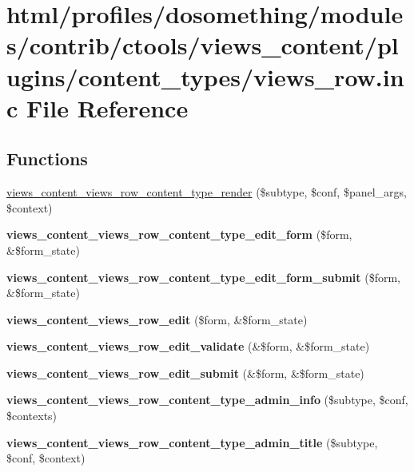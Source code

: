 \hypertarget{views__row_8inc}{
\section{html/profiles/dosomething/modules/contrib/ctools/views\_\-content/plugins/content\_\-types/views\_\-row.inc File Reference}
\label{views__row_8inc}
}
\subsection*{Functions}
\begin{DoxyCompactItemize}
\item 
\hyperlink{views__row_8inc_addde1c53bf68173bf2250309e339bf5b}{views\_\-content\_\-views\_\-row\_\-content\_\-type\_\-render} (\$subtype, \$conf, \$panel\_\-args, \$context)
\item 
\hypertarget{views__row_8inc_a03458e71f06b6793c866c384c4149c34}{
{\bfseries views\_\-content\_\-views\_\-row\_\-content\_\-type\_\-edit\_\-form} (\$form, \&\$form\_\-state)}
\label{views__row_8inc_a03458e71f06b6793c866c384c4149c34}

\item 
\hypertarget{views__row_8inc_a7c4f657c3f1f96528c1b8ce633894510}{
{\bfseries views\_\-content\_\-views\_\-row\_\-content\_\-type\_\-edit\_\-form\_\-submit} (\$form, \&\$form\_\-state)}
\label{views__row_8inc_a7c4f657c3f1f96528c1b8ce633894510}

\item 
\hypertarget{views__row_8inc_adf468e0c6a577476f3beafe89552516d}{
{\bfseries views\_\-content\_\-views\_\-row\_\-edit} (\$form, \&\$form\_\-state)}
\label{views__row_8inc_adf468e0c6a577476f3beafe89552516d}

\item 
\hypertarget{views__row_8inc_aea14ac09fb3b959871d43cfaca43ed7f}{
{\bfseries views\_\-content\_\-views\_\-row\_\-edit\_\-validate} (\&\$form, \&\$form\_\-state)}
\label{views__row_8inc_aea14ac09fb3b959871d43cfaca43ed7f}

\item 
\hypertarget{views__row_8inc_ae0ba9c5f277c64fdada8aa2403f90aed}{
{\bfseries views\_\-content\_\-views\_\-row\_\-edit\_\-submit} (\&\$form, \&\$form\_\-state)}
\label{views__row_8inc_ae0ba9c5f277c64fdada8aa2403f90aed}

\item 
\hypertarget{views__row_8inc_a3cb38007b49c955c04920d422d18f192}{
{\bfseries views\_\-content\_\-views\_\-row\_\-content\_\-type\_\-admin\_\-info} (\$subtype, \$conf, \$contexts)}
\label{views__row_8inc_a3cb38007b49c955c04920d422d18f192}

\item 
\hypertarget{views__row_8inc_a500a4768376c3068a57f34e18fd447cf}{
{\bfseries views\_\-content\_\-views\_\-row\_\-content\_\-type\_\-admin\_\-title} (\$subtype, \$conf, \$context)}
\label{views__row_8inc_a500a4768376c3068a57f34e18fd447cf}

\end{DoxyCompactItemize}
